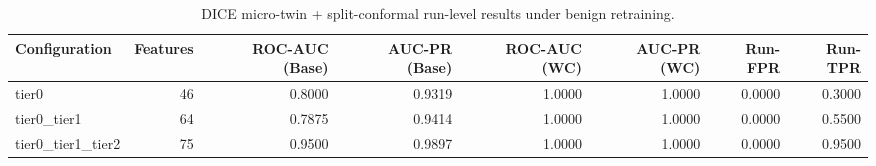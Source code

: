 \begin{table}[t]
\centering
\caption{DICE micro-twin + split-conformal run-level results under benign retraining.}
\label{tab:dice_full_overall}
\footnotesize
\begin{tabular}{lrrrrrrr}
\toprule
Configuration & Features & ROC-AUC (Base) & AUC-PR (Base) & ROC-AUC (WC) & AUC-PR (WC) & Run-FPR & Run-TPR \\
\midrule
tier0 & 46 & 0.8000 & 0.9319 & 1.0000 & 1.0000 & 0.0000 & 0.3000 \\
tier0_tier1 & 64 & 0.7875 & 0.9414 & 1.0000 & 1.0000 & 0.0000 & 0.5500 \\
tier0_tier1_tier2 & 75 & 0.9500 & 0.9897 & 1.0000 & 1.0000 & 0.0000 & 0.9500 \\
\bottomrule
\end{tabular}

\end{table}
